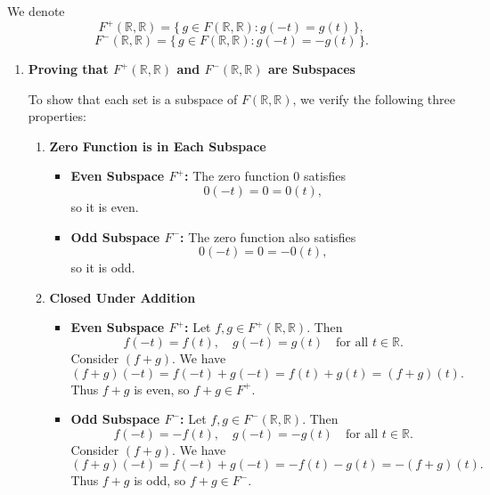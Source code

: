 \documentclass[12pt]{article}
\begin{document}
We denote
\[
F^+(\mathbb{R}, \mathbb{R}) = \{\,g \in F(\mathbb{R}, \mathbb{R}) : g(-t) = g(t)\,\}, 
\]
\[
F^-(\mathbb{R}, \mathbb{R}) = \{\,g \in F(\mathbb{R}, \mathbb{R}) : g(-t) = -g(t)\,\}.
\]

\begin{enumerate}[label=(\alph*)]
    \item \textbf{Proving that \(F^+(\mathbb{R}, \mathbb{R})\) and \(F^-(\mathbb{R}, \mathbb{R})\) are Subspaces}
    
    To show that each set is a subspace of \(F(\mathbb{R}, \mathbb{R})\), we verify the following three properties:
    
    \begin{enumerate}[label=\arabic*.]
        \item \textbf{Zero Function is in Each Subspace}
        
        \begin{itemize}
            \item \textbf{Even Subspace \(F^+\):}  
            The zero function \(0\) satisfies
            \[
                0(-t) = 0 = 0(t),
            \]
            so it is even.
            
            \item \textbf{Odd Subspace \(F^-\):}  
            The zero function also satisfies
            \[
                0(-t) = 0 = -0(t),
            \]
            so it is odd.
        \end{itemize}
        
        \item \textbf{Closed Under Addition}
        
        \begin{itemize}
            \item \textbf{Even Subspace \(F^+\):}  
            Let \(f, g \in F^+(\mathbb{R}, \mathbb{R})\). Then 
            \[
                f(-t) = f(t), \quad g(-t) = g(t) \quad \text{for all } t \in \mathbb{R}.
            \]
            Consider \((f + g)\). We have
            \[
                (f+g)(-t) = f(-t) + g(-t) = f(t) + g(t) = (f+g)(t).
            \]
            Thus \(f + g\) is even, so \(f + g \in F^+\).
            
            \item \textbf{Odd Subspace \(F^-\):}  
            Let \(f, g \in F^-(\mathbb{R}, \mathbb{R})\). Then
            \[
                f(-t) = -f(t), \quad g(-t) = -g(t) \quad \text{for all } t \in \mathbb{R}.
            \]
            Consider \((f + g)\). We have
            \[
                (f+g)(-t) = f(-t) + g(-t) = -f(t) - g(t) = -(f+g)(t).
            \]
            Thus \(f + g\) is odd, so \(f + g \in F^-\).
        \end{itemize}
        

\end{enumerate}
\end{enumerate}
\end{document}
